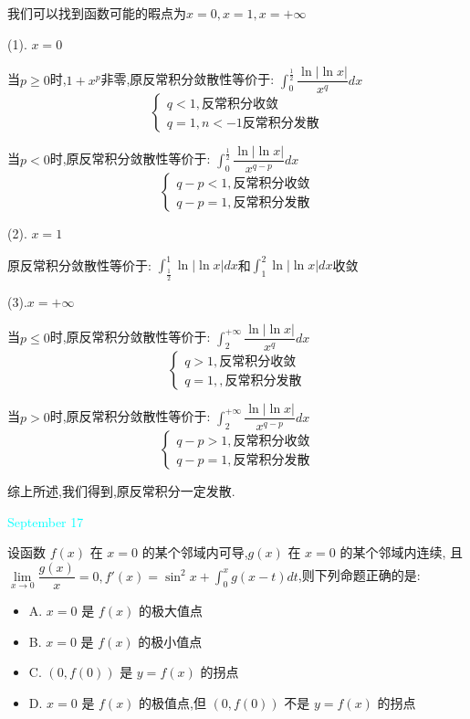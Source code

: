 \begin{solution}

	我们可以找到函数可能的暇点为$x=0,x=1,x=+\infty$
	
	(1). $x=0$
	
	当$p\geq 0$时,$1+x^{p}$非零,原反常积分敛散性等价于:  $\int_{0}^{\frac{1}{2}}\dfrac{\ln|\ln x|}{x^q}dx$
	$$\left\lbrace
	\begin{array}{l}
		q<1,\text{反常积分收敛}\\
		q=1,n<-1\text{反常积分发散}
	\end{array}
	\right. $$
	
	当$p<0$时,原反常积分敛散性等价于:  $\int_{0}^{\frac{1}{2}}\dfrac{\ln|\ln x|}{x^{q-p}}dx$
	$$\left\lbrace
	\begin{array}{l}
		q-p<1,\text{反常积分收敛}\\
		q-p=1,\text{反常积分发散}
	\end{array}
	\right. $$
	
	(2). $x=1$
	
	原反常积分敛散性等价于:  $\int_{\frac{1}{2}}^{1}\ln|\ln x|dx$和$\int_{1}^{2}\ln|\ln x|dx$收敛
	
	(3).$x=+\infty$
	
	当$p\leq 0$时,原反常积分敛散性等价于:  $\int_{2}^{+\infty}\dfrac{\ln|\ln x|}{x^q}dx$
	$$\left\lbrace
	\begin{array}{l}
		q>1,\text{反常积分收敛}\\
		q=1,,\text{反常积分发散}
	\end{array}
	\right. $$
	
	当$p>0$时,原反常积分敛散性等价于:  $\int_{2}^{+\infty}\dfrac{\ln|\ln x|}{x^{q-p}}dx$
	$$\left\lbrace
	\begin{array}{l}
		q-p>1,\text{反常积分收敛}\\
		q-p=1,\text{反常积分发散}
	\end{array}
	\right. $$
	
	综上所述,我们得到,原反常积分一定发散.
	
\end{solution}


\textcolor{cyan}{September 17}

\begin{example}[][Exam: 35.3.5]
	设函数 $f(x)$ 在 $x=0$ 的某个邻域内可导,$g(x)$ 在 $x=0$ 的某个邻域内连续,
	且 $\lim\limits_{x\to 0}\dfrac{g(x)}{x}=0, f'(x)=\sin^2 x+\int_{0}^{x}g(x-t)dt$,则下列命题正确的是:  
\begin{itemize}
	\item A. $x=0$ 是 $f(x)$ 的极大值点
	\item B. $x=0$ 是 $f(x)$ 的极小值点
	\item C. $(0,f(0))$ 是 $y=f(x)$ 的拐点
	\item D. $x=0$ 是 $f(x)$ 的极值点,但 $(0,f(0))$ 不是 $y=f(x)$ 的拐点
\end{itemize}
\end{example}

